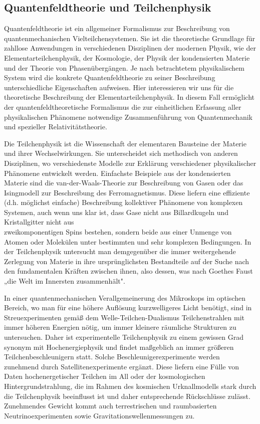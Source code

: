 \documentclass[10pt, letterpaper]{article}
\begin{document}
\subsection{Quantenfeldtheorie und Teilchenphysik}
Quantenfeldtheorie ist ein allgemeiner Formalismus zur Beschreibung von quantenmechanischen Vielteilchensystemen. Sie ist die theoretische Grundlage für zahllose Anwendungen in verschiedenen Disziplinen der modernen Physik, wie der Elementarteilchenphysik, der Kosmologie, der Physik der kondensierten Materie und der Theorie von Phasenübergängen. Je nach betrachtetem physikalischem System wird die konkrete Quantenfeldtheorie zu seiner Beschreibung unterschiedliche Eigenschaften aufweisen. Hier interessieren wir uns für die theoretische Beschreibung der Elementarteilchenphysik. In diesem Fall ermöglicht der quantenfeldtheoretische Formalismus die zur einheitlichen Erfassung aller physikalischen Phänomene notwendige Zusammenführung von Quantenmechanik und spezieller Relativitätstheorie.

Die Teilchenphysik ist die Wissenschaft der elementaren Bausteine der Materie und ihrer Wechselwirkungen. Sie unterscheidet sich methodisch von anderen Disziplinen, wo verschiedenste Modelle zur Erklärung verschiedener physikalischer Phänomene entwickelt werden. Einfachste Beispiele aus der kondensierten Materie sind die van-der-Waals-Theorie zur Beschreibung von Gasen oder das Isingmodell zur Beschreibung des Ferromagnetismus. Diese liefern eine effiziente (d.h. möglichst einfache) Beschreibung kollektiver Phänomene von komplexen Systemen, auch wenn uns klar ist, dass Gase nicht aus Billardkugeln und Kristallgitter nicht aus\\
zweikomponentigen Spins bestehen, sondern beide aus einer Unmenge von Atomen oder Molekülen unter bestimmten und sehr komplexen Bedingungen. In der Teilchenphysik untersucht man demgegenüber die immer weitergehende Zerlegung von Materie in ihre ursprünglichsten Bestandteile auf der Suche nach den fundamentalen Kräften zwischen ihnen, also dessen, was nach Goethes Faust „die Welt im Innersten zusammenhält".

In einer quantenmechanischen Verallgemeinerung des Mikroskops im optischen Bereich, wo man für eine höhere Auflösung kurzwelligeres Licht benötigt, sind in Streuexperimenten gemäß dem Welle-Teilchen-Dualismus Teilchenstrahlen mit immer höheren Energien nötig, um immer kleinere räumliche Strukturen zu untersuchen. Daher ist experimentelle Teilchenphysik zu einem gewissen Grad synonym mit Hochenergiephysik und findet maßgeblich an immer größeren Teilchenbeschleunigern statt. Solche Beschleunigerexperimente werden zunehmend durch Satellitenexperimente ergänzt. Diese liefern eine Fülle von Daten hochenergetischer Teilchen im All oder der kosmologischen Hintergrundstrahlung, die im Rahmen des kosmischen Urknallmodells stark durch die Teilchenphysik beeinflusst ist und daher entsprechende Rückschlüsse zulässt. Zunehmendes Gewicht kommt auch terrestrischen und raumbasierten Neutrinoexperimenten sowie Gravitationswellenmessungen zu.
\end{document}
